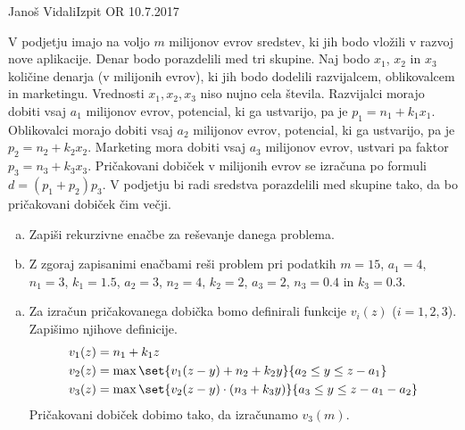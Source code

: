 \begin{naloga}{Janoš Vidali}{Izpit OR 10.7.2017}
\begin{vprasanje}
V podjetju imajo na voljo $m$ milijonov evrov sredstev,
ki jih bodo vložili v razvoj nove aplikacije.
Denar bodo porazdelili med tri skupine.
Naj bodo $x_1$, $x_2$ in $x_3$ količine denarja (v milijonih evrov),
ki jih bodo dodelili razvijalcem, oblikovalcem in marketingu.
Vrednosti $x_1, x_2, x_3$ niso nujno cela števila.
Razvijalci morajo dobiti vsaj $a_1$ milijonov evrov,
potencial, ki ga ustvarijo, pa je $p_1 = n_1 + k_1 x_1$.
Oblikovalci morajo dobiti vsaj $a_2$ milijonov evrov,
potencial, ki ga ustvarijo, pa je $p_2 = n_2 + k_2 x_2$.
Marketing mora dobiti vsaj $a_3$ milijonov evrov,
ustvari pa faktor $p_3 = n_3 + k_3 x_3$.
Pričakovani dobiček v milijonih evrov
se izračuna po formuli $d = (p_1 + p_2) p_3$.
V podjetju bi radi sredstva porazdelili med skupine tako,
da bo pričakovani dobiček čim večji.

\begin{enumerate}[(a)]
\item Zapiši rekurzivne enačbe za reševanje danega problema.
\item Z zgoraj zapisanimi enačbami reši problem
pri podatkih $m = 15$, $a_1 = 4$, $n_1 = 3$, $k_1 = 1.5$,
$a_2 = 3$, $n_2 = 4$, $k_2 = 2$, $a_3 = 2$, $n_3 = 0.4$ in $k_3 = 0.3$.
\end{enumerate}
\end{vprasanje}

\begin{odgovor}
\begin{enumerate}[(a)]
\item Za izračun pričakovanega dobička
bomo definirali funkcije $v_i(z)$ ($i = 1, 2, 3$).
Zapišimo njihove definicije.
\begin{align*}
v_1(z) &= n_1 + k_1 z \\
v_2(z) &= \max\set{v_1(z-y) + n_2 + k_2 y}{a_2 \le y \le z - a_1} \\
v_3(z) &= \max\set{v_2(z-y) \cdot (n_3 + k_3 y)}{a_3 \le y \le z - a_1 - a_2}
\end{align*}
Pričakovani dobiček dobimo tako, da izračunamo $v_3(m)$.


\end{enumerate}
\end{odgovor}
\end{naloga}
